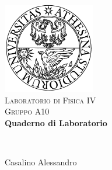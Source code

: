 \begin{titlepage}
\begin{center}

\includegraphics[width=0.3\textwidth]{unitn_logo.jpg}~\\[1cm]

\textsc{\LARGE Laboratorio di Fisica IV}\\[1.5cm]
\textsc{\Large Gruppo A10}\\[0.5cm]

{ \huge \bfseries Quaderno di Laboratorio}\\[0.4cm]

\begin{minipage}{0.4\textwidth}
\begin{flushleft} \large
\emph{}\\
\centerline {\large Casalino Alessandro}
\end{flushleft}
\end{minipage}

\vfill

{\large}

\end{center}
\end{titlepage}
